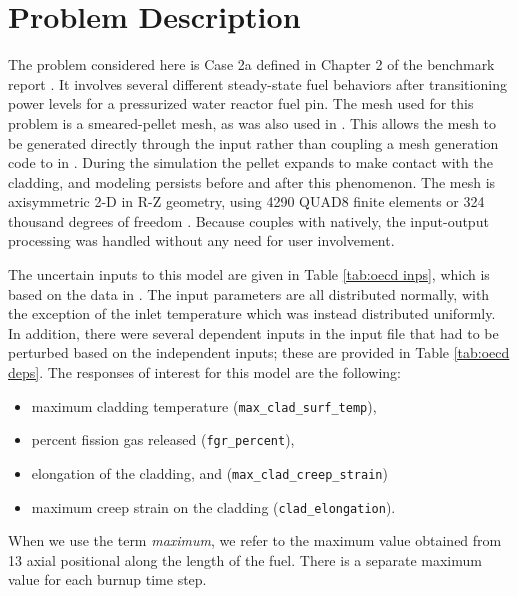 \section{Problem Description}
The problem considered here is Case 2a defined in Chapter 2 of the benchmark report \cite{OECDbenchmark}.  It
involves several different steady-state fuel behaviors after transitioning power levels for a pressurized
water reactor fuel pin.  The \bison{} mesh used for this problem is a smeared-pellet mesh, as was also used in
\cite{OECDdakota}.  This allows the mesh to be generated directly through the \bison{} input rather than
coupling a mesh generation code to \bison{} in \raven{}.  During the simulation the pellet expands to make
contact with the cladding, and modeling persists before and after this phenomenon.  The mesh is axisymmetric
2-D in R-Z geometry, using 4290 QUAD8 finite elements or 324 thousand degrees of freedom \cite{OECDdakota}.
Because \raven{} couples with \bison{} natively, the input-output processing was handled without any need for
user involvement.

The uncertain inputs to this model are given in Table \ref{tab:oecd inps}, which is based on the data in
\cite{OECDdakota}.  The input parameters are all distributed normally, with the exception of the inlet
temperature which was instead distributed uniformly.  In addition, there were several dependent inputs in the \bison{}
input file that had to be perturbed based on the independent inputs; these are provided in Table \ref{tab:oecd deps}.
The responses of interest for this model are the following:
\begin{itemize}
  \item maximum cladding temperature (\texttt{max\_clad\_surf\_temp}),
  \item percent fission gas released (\texttt{fgr\_percent}), 
  \item elongation of the cladding, and (\texttt{max\_clad\_creep\_strain})
  \item maximum creep strain on the cladding (\texttt{clad\_elongation}).
\end{itemize}
When we use the term \emph{maximum}, we refer to the maximum value obtained from 13 axial positional along the
length of the fuel.  There is a separate maximum value for each burnup time step.

